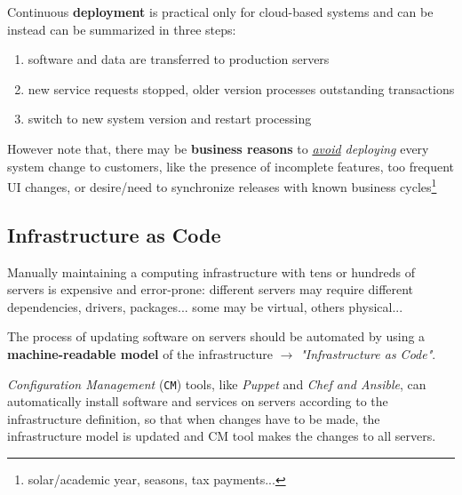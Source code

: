 Continuous \textbf{deployment} is practical only for cloud-based systems and can be instead can be summarized in three steps:
\begin{enumerate}
   \item software and data are transferred to
   production servers
   \item new service requests stopped, older
   version processes outstanding
   transactions
   \item switch to new system version and
   restart processing
\end{enumerate}

However note that, there may be \textbf{business reasons} to \textit{\underline{avoid} deploying} every system change to customers,
like the presence of incomplete features, too frequent UI changes, or desire/need to synchronize releases with known business cycles\footnote{solar/academic year, seasons, tax payments...}

\subsection{Infrastructure as Code}
Manually maintaining a computing infrastructure with tens or
hundreds of servers is expensive and error-prone:
different servers may require different dependencies, drivers, packages... some may be virtual, others physical...

The process of updating software on servers should be automated by using a \textbf{machine-readable model} of the infrastructure $\longrightarrow$ \textit{"Infrastructure as Code"}.

\textit{Configuration Management} (\texttt{CM}) tools, like
\textit{Puppet} and \textit{Chef and Ansible}, can
automatically install software and services
on servers according to the infrastructure
definition, so that when changes have to be made,
the infrastructure model is updated and CM tool makes the changes to all servers.

